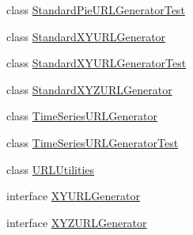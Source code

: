 \begin{DoxyCompactItemize}
class \mbox{\hyperlink{classorg_1_1jfree_1_1chart_1_1urls_1_1_standard_pie_u_r_l_generator_test}{Standard\+Pie\+U\+R\+L\+Generator\+Test}}
\item 
class \mbox{\hyperlink{classorg_1_1jfree_1_1chart_1_1urls_1_1_standard_x_y_u_r_l_generator}{Standard\+X\+Y\+U\+R\+L\+Generator}}
\item 
class \mbox{\hyperlink{classorg_1_1jfree_1_1chart_1_1urls_1_1_standard_x_y_u_r_l_generator_test}{Standard\+X\+Y\+U\+R\+L\+Generator\+Test}}
\item 
class \mbox{\hyperlink{classorg_1_1jfree_1_1chart_1_1urls_1_1_standard_x_y_z_u_r_l_generator}{Standard\+X\+Y\+Z\+U\+R\+L\+Generator}}
\item 
class \mbox{\hyperlink{classorg_1_1jfree_1_1chart_1_1urls_1_1_time_series_u_r_l_generator}{Time\+Series\+U\+R\+L\+Generator}}
\item 
class \mbox{\hyperlink{classorg_1_1jfree_1_1chart_1_1urls_1_1_time_series_u_r_l_generator_test}{Time\+Series\+U\+R\+L\+Generator\+Test}}
\item 
class \mbox{\hyperlink{classorg_1_1jfree_1_1chart_1_1urls_1_1_u_r_l_utilities}{U\+R\+L\+Utilities}}
\item 
interface \mbox{\hyperlink{interfaceorg_1_1jfree_1_1chart_1_1urls_1_1_x_y_u_r_l_generator}{X\+Y\+U\+R\+L\+Generator}}
\item 
interface \mbox{\hyperlink{interfaceorg_1_1jfree_1_1chart_1_1urls_1_1_x_y_z_u_r_l_generator}{X\+Y\+Z\+U\+R\+L\+Generator}}
\end{DoxyCompactItemize}
